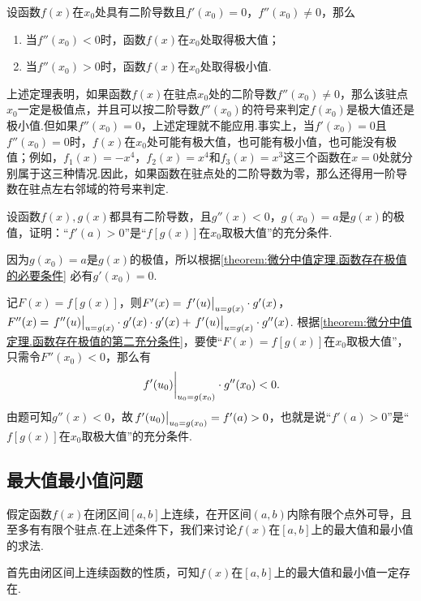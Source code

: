 \begin{theorem}[函数存在极值的第二充分条件]\label{theorem:微分中值定理.函数存在极值的第二充分条件}
设函数\(f(x)\)在\(x_0\)处具有二阶导数且\(f'(x_0)=0\)，\(f''(x_0)\neq 0\)，那么
\begin{enumerate}
\item 当\(f''(x_0)<0\)时，函数\(f(x)\)在\(x_0\)处取得极大值；
\item 当\(f''(x_0)>0\)时，函数\(f(x)\)在\(x_0\)处取得极小值.
\end{enumerate}
\end{theorem}
上述定理表明，如果函数\(f(x)\)在驻点\(x_0\)处的二阶导数\(f''(x_0)\neq0\)，那么该驻点\(x_0\)一定是极值点，并且可以按二阶导数\(f''(x_0)\)的符号来判定\(f(x_0)\)是极大值还是极小值.但如果\(f''(x_0)=0\)，上述定理就不能应用.事实上，当\(f'(x_0)=0\)且\(f''(x_0)=0\)时，\(f(x)\)在\(x_0\)处可能有极大值，也可能有极小值，也可能没有极值；例如，\(f_1(x) = -x^4\)，\(f_2(x) = x^4\)和\(f_3(x) = x^3\)这三个函数在\(x=0\)处就分别属于这三种情况.因此，如果函数在驻点处的二阶导数为零，那么还得用一阶导数在驻点左右邻域的符号来判定.

\begin{example}
设函数\(f(x),g(x)\)都具有二阶导数，且\(g''(x)<0\)，\(g(x_0)=a\)是\(g(x)\)的极值，证明：“\(f'(a)>0\)”是“\(f[g(x)]\)在\(x_0\)取极大值”的充分条件.
\begin{solution}
因为\(g(x_0)=a\)是\(g(x)\)的极值，所以根据\cref{theorem:微分中值定理.函数存在极值的必要条件} 必有\(g'(x_0)=0\).

记\(F(x) = f[g(x)]\)，则\(F'(x) = \eval{f'(u)}_{u=g(x)} \cdot g'(x)\)，\(F''(x) = \eval{f''(u)}_{u=g(x)} \cdot g'(x) \cdot g'(x) + \eval{f'(u)}_{u=g(x)} \cdot g''(x)\).
根据\cref{theorem:微分中值定理.函数存在极值的第二充分条件}，要使“\(F(x)=f[g(x)]\)在\(x_0\)取极大值”，只需令\(F''(x_0) < 0\)，那么有\[
\eval{f'(u_0)}_{u_0=g(x_0)} \cdot g''(x_0) < 0.
\]由题可知\(g''(x)<0\)，故\(\eval{f'(u_0)}_{u_0=g(x_0)} = f'(a) > 0\)，也就是说“\(f'(a)>0\)”是“\(f[g(x)]\)在\(x_0\)取极大值”的充分条件.
\end{solution}
\end{example}

\subsection{最大值最小值问题}
假定函数\(f(x)\)在闭区间\([a,b]\)上连续，在开区间\((a,b)\)内除有限个点外可导，且至多有有限个驻点.在上述条件下，我们来讨论\(f(x)\)在\([a,b]\)上的最大值和最小值的求法.

首先由闭区间上连续函数的性质，可知\(f(x)\)在\([a,b]\)上的最大值和最小值一定存在.

